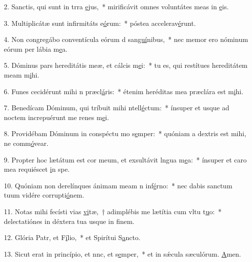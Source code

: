 2. Sanctis, qui sunt in trra \uline{e}jus,~* mirificávit omnes voluntátes meas in \uline{e}is.\par 
3. Multiplicátæ sunt infirmitáts e\uline{ó}rum:~* póstea accelerav\uline{é}runt.\par 
4. Non congregábo conventícula eórum d san\uline{guí}nibus,~* nec memor ero nóminum eórum per lábia m\uline{e}a.\par 
5. Dóminus pars hereditátis meæ, et cálcis m\uline{e}i:~* tu es, qui restítues hereditátem meam m\uline{i}hi.\par 
6. Funes cecidérunt mihi n præcl\uline{á}ris:~* étenim heréditas mea præclára est m\uline{i}hi.\par 
7. Benedícam Dóminum, qui tríbuit mihi ntell\uline{é}ctum:~* ínsuper et usque ad noctem increpuérunt me renes m\uline{e}i.\par 
8. Providébam Dóminum in conspéctu mo s\uline{e}mper:~* quóniam a dextris est mihi, ne comm\uline{ó}vear.\par 
9. Propter hoc lætátum est cor meum, et exsultávit lngua m\uline{e}a:~* ínsuper et caro mea requiéscet \uline{i}n spe.\par 
10. Quóniam non derelínques ánimam meam n inf\uline{é}rno:~* nec dabis sanctum tuum vidére corrupti\uline{ó}nem.\par 
11. Notas mihi fecísti vias \uline{vi}tæ,~† adimplébis me lætítia cum vltu t\uline{u}o:~* delectatiónes in déxtera tua usque in f\uline{i}nem.\par 
12. Glória Patr, et F\uline{í}lio,~* et Spirítui S\uline{a}ncto.\par 
13. Sicut erat in princípio, et nnc, et s\uline{e}mper,~* et in sǽcula sæculórum. \uline{A}men.\par 
